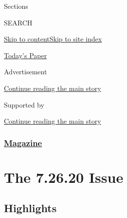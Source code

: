 Sections

SEARCH

\protect\hyperlink{site-content}{Skip to
content}\protect\hyperlink{site-index}{Skip to site index}

\href{https://myaccount.nytimes3xbfgragh.onion/auth/login?response_type=cookie\&client_id=vi}{}

\href{https://www.nytimes3xbfgragh.onion/section/todayspaper}{Today's
Paper}

Advertisement

\protect\hyperlink{after-top}{Continue reading the main story}

Supported by

\protect\hyperlink{after-sponsor}{Continue reading the main story}

\hypertarget{magazine}{%
\subsubsection{\texorpdfstring{\href{/section/magazine}{Magazine}}{Magazine}}\label{magazine}}

\hypertarget{the-72620-issue}{%
\section{The 7.26.20 Issue}\label{the-72620-issue}}

\hypertarget{highlights}{%
\subsection{Highlights}\label{highlights}}

